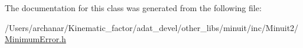 The documentation for this class was generated from the following file\+:\begin{DoxyCompactItemize}
\item 
/\+Users/archanar/\+Kinematic\+\_\+factor/adat\+\_\+devel/other\+\_\+libs/minuit/inc/\+Minuit2/\mbox{\hyperlink{other__libs_2minuit_2inc_2Minuit2_2MinimumError_8h}{Minimum\+Error.\+h}}\end{DoxyCompactItemize}
